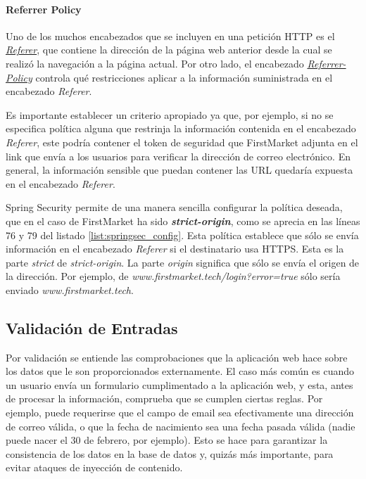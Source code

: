 \documentclass[a4paper]{article}
\begin{document}
	\paragraph{Referrer  Policy}
	Uno de los muchos encabezados que se incluyen en una petición HTTP es el \href{https://developer.mozilla.org/en-US/docs/Web/HTTP/Headers/Referer}{\emph{Referer}}, que contiene la dirección de la página web anterior desde la cual se realizó la navegación a la página actual. Por otro lado, el encabezado \href{https://developer.mozilla.org/en-US/docs/Web/HTTP/Headers/Referrer-Policy}{\emph{Referrer-Policy}} controla qué restricciones aplicar a la información suministrada en el encabezado \emph{Referer}.
	
	Es importante establecer un criterio apropiado ya que, por ejemplo, si no se especifica política alguna que restrinja la información contenida en el encabezado \emph{Referer}, este podría contener el token de seguridad que FirstMarket adjunta en el link que envía a los usuarios para verificar la dirección de correo electrónico. En general, la información sensible que puedan contener las URL quedaría expuesta en el encabezado \emph{Referer}.
	
	Spring Security permite de una manera sencilla configurar la política deseada, que en el caso de FirstMarket ha sido \textbf{\emph{strict-origin}}, como se aprecia en las líneas 76 y 79 del listado \ref{list:springsec_config}. Esta política establece que sólo se envía información en el encabezado \emph{Referer} si el destinatario usa HTTPS. Esta es la parte \emph{strict} de \emph{strict-origin}. La parte \emph{origin} significa que sólo se envía el origen de la dirección. Por ejemplo, de \emph{www.firstmarket.tech/login?error=true} sólo sería enviado \emph{www.firstmarket.tech}.
	

	\subsection{Validación de Entradas}
	Por validación se entiende las comprobaciones que la aplicación web hace sobre los datos que le son proporcionados externamente. El caso más común es cuando un usuario envía un formulario cumplimentado a la aplicación web, y esta, antes de procesar la información, comprueba que se cumplen ciertas reglas. Por ejemplo, puede requerirse que el campo de email sea efectivamente una dirección de correo válida, o que la fecha de nacimiento sea una fecha pasada válida (nadie puede nacer el 30 de febrero, por ejemplo). Esto se hace para garantizar la consistencia de los datos en la base de datos y, quizás más importante, para evitar ataques de inyección de contenido.
	
\end{document}
